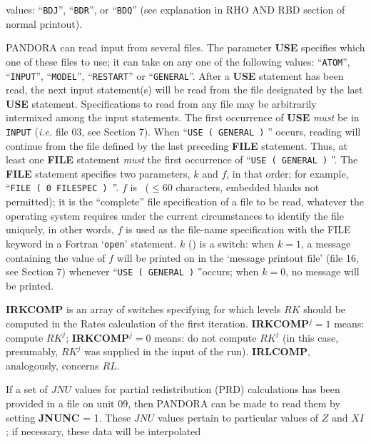 values: ``{\tt BDJ}'', ``{\tt BDR}'', or ``{\tt BDQ}''
(see explanation in RHO AND RBD section of normal printout).
\ej
\centerline{}
\space \noindent
PANDORA can read input from several files. The parameter {\bf USE} specifies
which one of these files to use; it can take on any one of the following
values: ``{\tt ATOM}'', ``{\tt INPUT}'', ``{\tt MODEL}'', ``{\tt RESTART}''
or ``{\tt GENERAL}''. \np
After a {\bf USE} statement has been read, the next input statement(s) will
be read from the file designated by the last {\bf USE} statement.
Specifications to read from any file may be arbitrarily intermixed among the
input statements. The first occurrence of {\bf USE} {\it must}
be in {\tt INPUT} ({\it i.e.} file 03, see Section 7). \np
When ``{\tt USE ( GENERAL )} '' occurs, reading will continue from 
the file defined by the last preceding {\bf FILE} statement. 
Thus, at least one {\bf FILE} statement {\it must}  the 
first occurrence of  ``{\tt USE ( GENERAL )} ''. \np
The {\bf FILE} statement specifies two parameters, $k$ and $f$, in that order;
for example, ``{\tt FILE ( 0 FILESPEC ) }''. $f$ is \alfa\ 
($ \leq 60$ characters, embedded blanks not permitted); 
it is the ``complete'' file specification of a file to be read,
\ie whatever the operating system requires under the current circumstances
to identify the file uniquely, in other words, $f$ is used as the file-name
specification with the FILE keyword in a Fortran `{\tt open}' statement.
$k$ (\intg) is a switch: when $k = 1$, a message containing the value of
$f$ will be printed on in the `message printout file' (\ie file 16, see
Section 7) whenever ``{\tt USE ( GENERAL )} ''occurs; when $k = 0$,
no message will be printed.
\blankline
\blankline
\centerline{}
\space \noindent
{\bf IRKCOMP} is an array of switches specifying for which levels $RK$ should
be computed in the Rates calculation of the first iteration. 
{\bf IRKCOMP}$^j = 1$ means: compute $RK^j$; {\bf IRKCOMP}$^j = 0$ means:
do not compute $RK^j$ (in this case, presumably, $RK^j$ was supplied in
the input of the run). {\bf IRLCOMP}, analogously, concerns $RL$.
\blankline
\blankline
\centerline{}
\space \noindent
If a set of $JNU$ values for partial redistribution (PRD) calculations
has been provided in a file on unit 09, then PANDORA can be made to read them
by setting {\bf JNUNC} = 1. These $JNU$ values pertain to particular values of
$Z$ and $XI$; if necessary, these data will be interpolated
